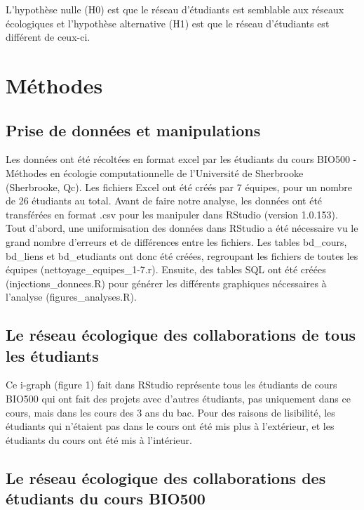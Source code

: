 \documentclass[twoside,twocolumn]{article}
\begin{document}
L’hypothèse nulle (H0) est que le réseau d’étudiants est semblable aux réseaux écologiques et l’hypothèse alternative (H1) est que le réseau d’étudiants est différent de ceux-ci.



\section{Méthodes}


\subsection{Prise de données et manipulations}

Les données ont été récoltées en format excel par les étudiants du cours BIO500 - Méthodes en écologie computationnelle de l’Université de Sherbrooke (Sherbrooke, Qc). Les fichiers Excel ont été créés par 7 équipes, pour un nombre de 26 étudiants au total. Avant de faire notre analyse, les données ont été transférées en format .csv pour les manipuler dans RStudio (version 1.0.153).  Tout d’abord, une uniformisation des données dans RStudio a été nécessaire vu le grand nombre d’erreurs et de différences entre les fichiers. Les tables bd_cours, bd_liens et bd_etudiants ont donc été créées, regroupant les fichiers de toutes les équipes (nettoyage_equipes_1-7.r). Ensuite, des tables SQL ont été  créées (injections_donnees.R) pour générer les différents graphiques nécessaires à l’analyse (figures_analyses.R).

\subsection{Le réseau écologique des collaborations de tous les étudiants}

Ce i-graph (figure 1) fait dans RStudio représente tous les étudiants de cours BIO500 qui ont fait des projets avec d’autres étudiants, pas uniquement dans ce cours, mais dans les cours  des 3 ans du bac. Pour des raisons de lisibilité, les étudiants qui n’étaient pas dans le cours ont été mis plus à l’extérieur, et les étudiants du cours ont été mis à l’intérieur.

\subsection{Le réseau écologique des collaborations des étudiants du cours BIO500}
\end{document}
